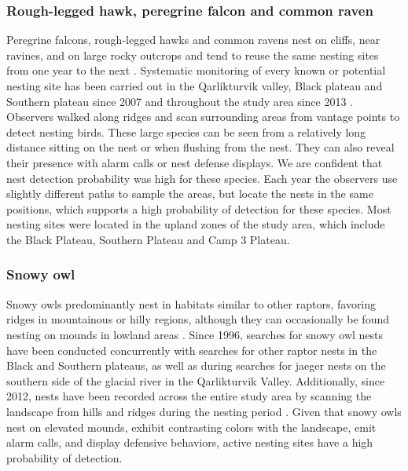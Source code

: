 \documentclass[a4paper,twoside,10pt]{article}
\begin{document}
\subsubsection*{Rough-legged hawk, peregrine falcon and common raven}
Peregrine falcons, rough-legged hawks and common ravens nest on cliffs, near ravines, and on large rocky outcrops and tend to reuse the same nesting sites from one year to the next \citep{beardsell2016}. Systematic monitoring of every known or potential nesting site has been carried out in the Qarlikturvik valley, Black plateau and Southern plateau since 2007 and throughout the study area since 2013 \citep{beardsell2016, gauthier2020avianpred}. Observers walked along ridges and scan surrounding areas from vantage points to detect nesting birds. These large species can be seen from a relatively long distance sitting on the nest or when flushing from the nest. They can also reveal their presence with alarm calls or nest defense displays. We are confident that nest detection probability was high for these species. Each year the observers use slightly different paths to sample the areas, but locate the nests in the same positions, which supports a high probability of detection for these species. Most nesting sites were located in the upland zones of the study area, which include the Black Plateau, Southern Plateau and Camp 3 Plateau.

\subsubsection*{Snowy owl}
Snowy owls predominantly nest in habitats similar to other raptors, favoring ridges in mountainous or hilly regions, although they can occasionally be found nesting on mounds in lowland areas \citep{seyer2020}. Since 1996, searches for snowy owl nests have been conducted concurrently with searches for other raptor nests in the Black and Southern plateaus, as well as during searches for jaeger nests on the southern side of the glacial river in the Qarlikturvik Valley. Additionally, since 2012, nests have been recorded across the entire study area by scanning the landscape from hills and ridges during the nesting period \citep{duchesne2021}. Given that snowy owls nest on elevated mounds, exhibit contrasting colors with the landscape, emit alarm calls, and display defensive behaviors, active nesting sites have a high probability of detection.
\end{document}
